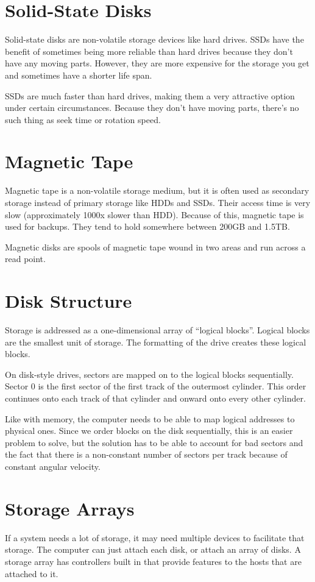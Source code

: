 \documentclass{article}
\begin{document}
\section{Solid-State Disks}
Solid-state disks are non-volatile storage devices like hard drives. SSDs
have the benefit of sometimes being more reliable than hard drives because they
don't have any moving parts. However, they are more expensive for the storage
you get and sometimes have a shorter life span.

SSDs are much faster than hard drives, making them a very attractive option
under certain circumstances. Because they don't have moving parts, there's no
such thing as seek time or rotation speed.

\section{Magnetic Tape}
Magnetic tape is a non-volatile storage medium, but it is often used as
secondary storage instead of primary storage like HDDs and SSDs. Their access
time is very slow (approximately 1000x slower than HDD). Because of this,
magnetic tape is used for backups. They tend to hold somewhere between 200GB
and 1.5TB.

Magnetic disks are spools of magnetic tape wound in two areas and run across
a read point.

\section{Disk Structure}
Storage is addressed as a one-dimensional array of ``logical blocks''. Logical
blocks are the smallest unit of storage. The formatting of the drive creates
these logical blocks.

On disk-style drives, sectors are mapped on to the logical blocks sequentially.
Sector 0 is the first sector of the first track of the outermost cylinder.
This order continues onto each track of that cylinder and onward onto every
other cylinder.

Like with memory, the computer needs to be able to map logical addresses to
physical ones. Since we order blocks on the disk sequentially, this is an
easier problem to solve, but the solution has to be able to account for bad
sectors and the fact that there is a non-constant number of sectors per track
because of constant angular velocity.

\section{Storage Arrays}
If a system needs a lot of storage, it may need multiple devices to facilitate
that storage. The computer can just attach each disk, or attach an array of
disks. A storage array has controllers built in that provide features to the
hosts that are attached to it.
\end{document}
